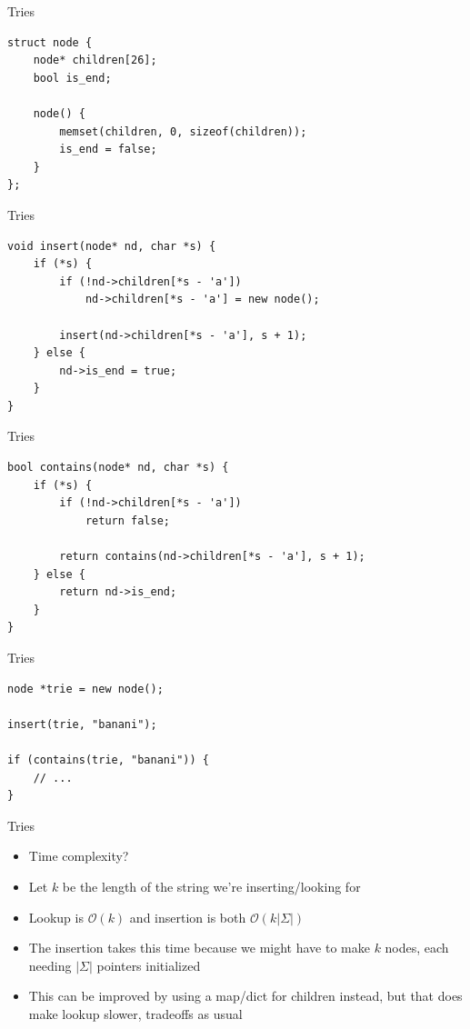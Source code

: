 \documentclass{beamer}
\begin{document}
\begin{frame}{Tries}
    \begin{verbatim}
struct node {
    node* children[26];
    bool is_end;

    node() {
        memset(children, 0, sizeof(children));
        is_end = false;
    }
};
    \end{verbatim}
\end{frame}

\begin{frame}{Tries}
    \begin{verbatim}
void insert(node* nd, char *s) {
    if (*s) {
        if (!nd->children[*s - 'a'])
            nd->children[*s - 'a'] = new node();

        insert(nd->children[*s - 'a'], s + 1);
    } else {
        nd->is_end = true;
    }
}
    \end{verbatim}
\end{frame}

\begin{frame}{Tries}
    \begin{verbatim}
bool contains(node* nd, char *s) {
    if (*s) {
        if (!nd->children[*s - 'a'])
            return false;

        return contains(nd->children[*s - 'a'], s + 1);
    } else {
        return nd->is_end;
    }
}
    \end{verbatim}
\end{frame}

\begin{frame}{Tries}
    \begin{verbatim}
node *trie = new node();

insert(trie, "banani");

if (contains(trie, "banani")) {
    // ...
}
    \end{verbatim}
\end{frame}

\begin{frame}[plain]{Tries}
    \begin{itemize}
        \item Time complexity?
        \vspace{10pt}
        \item Let $k$ be the length of the string we're inserting/looking for
        \item Lookup is $\mathcal{O}(k)$ and insertion is both $\mathcal{O}(k|\Sigma|)$
        \item The insertion takes this time because we might have to make $k$ nodes, each needing $|\Sigma|$ pointers initialized
        \item This can be improved by using a map/dict for children instead, but that does make lookup slower, tradeoffs as usual
    \end{itemize}
\end{frame}
\end{document}

